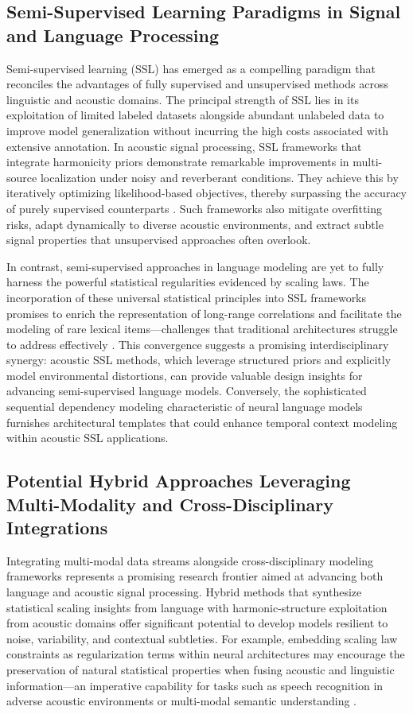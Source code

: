 \subsection{Semi-Supervised Learning Paradigms in Signal and Language Processing}

Semi-supervised learning (SSL) has emerged as a compelling paradigm that reconciles the advantages of fully supervised and unsupervised methods across linguistic and acoustic domains. The principal strength of SSL lies in its exploitation of limited labeled datasets alongside abundant unlabeled data to improve model generalization without incurring the high costs associated with extensive annotation. In acoustic signal processing, SSL frameworks that integrate harmonicity priors demonstrate remarkable improvements in multi-source localization under noisy and reverberant conditions. They achieve this by iteratively optimizing likelihood-based objectives, thereby surpassing the accuracy of purely supervised counterparts \cite{ref52}. Such frameworks also mitigate overfitting risks, adapt dynamically to diverse acoustic environments, and extract subtle signal properties that unsupervised approaches often overlook.

In contrast, semi-supervised approaches in language modeling are yet to fully harness the powerful statistical regularities evidenced by scaling laws. The incorporation of these universal statistical principles into SSL frameworks promises to enrich the representation of long-range correlations and facilitate the modeling of rare lexical items—challenges that traditional architectures struggle to address effectively \cite{ref51}. This convergence suggests a promising interdisciplinary synergy: acoustic SSL methods, which leverage structured priors and explicitly model environmental distortions, can provide valuable design insights for advancing semi-supervised language models. Conversely, the sophisticated sequential dependency modeling characteristic of neural language models furnishes architectural templates that could enhance temporal context modeling within acoustic SSL applications.

\subsection{Potential Hybrid Approaches Leveraging Multi-Modality and Cross-Disciplinary Integrations}

Integrating multi-modal data streams alongside cross-disciplinary modeling frameworks represents a promising research frontier aimed at advancing both language and acoustic signal processing. Hybrid methods that synthesize statistical scaling insights from language with harmonic-structure exploitation from acoustic domains offer significant potential to develop models resilient to noise, variability, and contextual subtleties. For example, embedding scaling law constraints as regularization terms within neural architectures may encourage the preservation of natural statistical properties when fusing acoustic and linguistic information—an imperative capability for tasks such as speech recognition in adverse acoustic environments or multi-modal semantic understanding \cite{ref51,ref52}.

